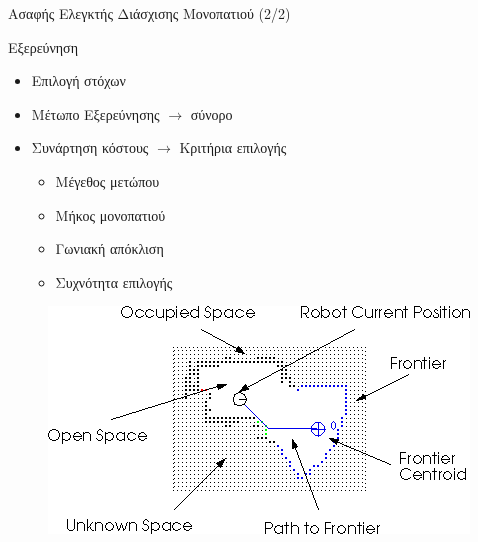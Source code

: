 \documentclass[10pt, compress]{beamer}
\begin{document}
\begin{frame}{Ασαφής Ελεγκτής Διάσχισης Μονοπατιού (2/2)}
\begin{minipage}{0.75\textwidth}
\begin{figure}
		\end{figure}
	\end{minipage}%
\end{frame}

\begin{frame}{Εξερεύνηση}
	\begin{itemize}
		\item Επιλογή στόχων
		\item Μέτωπο Εξερεύνησης $\rightarrow$ σύνορο
		\item Συνάρτηση κόστους $\rightarrow$ Κριτήρια επιλογής
		\begin{itemize}
			\item Μέγεθος μετώπου
			\item Μήκος μονοπατιού
			\item Γωνιακή απόκλιση
			\item Συχνότητα επιλογής
		\end{itemize}
	\end{itemize}
	\begin{figure}
		\includegraphics[width=0.7\linewidth]{Figures/frontier_exploration.png}
	\end{figure}
\end{frame}
\end{document}
